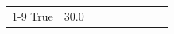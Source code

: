 \begin{table}[H]
{\begin{tabular}{lllrlllll}
\cline{1-9}
True & 30.0%










\end{tabular}}
\end{table}
